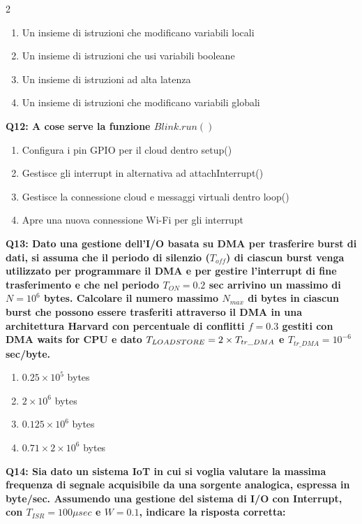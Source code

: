 \documentclass[10pt]{article}
\begin{document}
\begin{multicols}{2}
\begin{enumerate}[label=\arabic*.]
\item Un insieme di istruzioni che modificano variabili locali
\item Un insieme di istruzioni che usi variabili booleane
\item Un insieme di istruzioni ad alta latenza
\item Un insieme di istruzioni che modificano variabili globali
\end{enumerate}
\textbf{Q12: A cose serve la funzione $Blink.run()$}

\begin{enumerate}[label=\arabic*.]
\item Configura i pin GPIO per il cloud dentro setup()
\item Gestisce gli interrupt in alternativa ad attachInterrupt()
\item Gestisce la connessione cloud e messaggi virtuali dentro loop()
\item Apre una nuova connessione Wi-Fi per gli interrupt
\end{enumerate}
\textbf{Q13: Dato una gestione dell’I/O basata su DMA per trasferire burst di dati, si assuma che il periodo di silenzio  ($T_{off}$) di ciascun burst venga utilizzato per programmare il DMA e per gestire l’interrupt di fine trasferimento e che nel periodo $T_{ON} = 0.2$ sec arrivino un massimo di $N=10^6$ bytes. Calcolare il numero massimo $N_{max}$ di bytes in ciascun burst che possono essere trasferiti attraverso il DMA in una architettura Harvard con percentuale di conflitti $f = 0.3$ gestiti con DMA waits for CPU e dato $T_{LOAD\/STORE} = 2 \times T_{tr\_DMA}$ e $T_{tr\_DMA} = 10^{-6}$ sec/byte.}

\begin{enumerate}[label=\arabic*.]
\item $0.25 \times 10^5$ bytes
\item $2 \times 10^6$ bytes
\item $0.125 \times 10^6$ bytes
\item $0.71 \times 2 \times 10^6$ bytes
\end{enumerate}
\textbf{Q14: Sia dato un sistema IoT in cui si voglia valutare la massima frequenza di segnale acquisibile da una sorgente analogica, espressa in byte/sec. Assumendo una gestione del sistema di I/O con Interrupt, con $T_{ISR}=100\mu sec$ e $W=0.1$, indicare la risposta corretta:}


\end{multicols}
\end{document}
